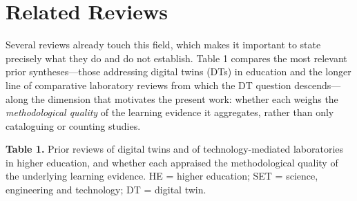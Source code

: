 \section{Related Reviews}\label{related-reviews}

Several reviews already touch this field, which makes it important to state
precisely what they do and do not establish. Table 1 compares the most relevant
prior syntheses---those addressing digital twins (DTs) in education and the longer
line of comparative laboratory reviews from which the DT question descends---along
the dimension that motivates the present work: whether each weighs the
\emph{methodological quality} of the learning evidence it aggregates, rather than only
cataloguing or counting studies.

\textbf{Table 1.} Prior reviews of digital twins and of technology-mediated laboratories in higher education, and whether each appraised the methodological quality of the underlying learning evidence. HE = higher education; SET = science, engineering and technology; DT = digital twin.

